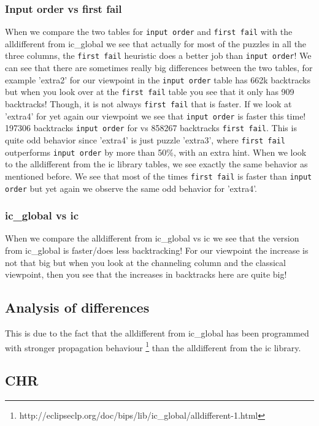 \documentclass{report}
\begin{document}
\subsubsection{Input order vs first fail}
When we compare the two tables for \texttt{input order} and \texttt{first fail} with the alldifferent from ic\_global we see that actually for most of the puzzles in all the three columns, the \texttt{first fail} heuristic does a better job than \texttt{input order}! We can see that there are sometimes really big differences between the two tables, for example 'extra2' for our viewpoint in the \texttt{input order} table has 662k backtracks but when you look over at the \texttt{first fail} table you see that it only has 909 backtracks! Though, it is not always \texttt{first fail} that is faster. If we look at 'extra4' for yet again our viewpoint we see that \texttt{input order} is faster this time! 197306 backtracks \texttt{input order} for vs 858267 backtracks \texttt{first fail}. This is quite odd behavior since 'extra4' is just puzzle 'extra3', where \texttt{first fail} outperforms \texttt{input order} by more than 50\%, with an extra hint.
\newline
\newline
When we look to the alldifferent from the ic library tables, we see exactly the same behavior as mentioned before. We see that most of the times \texttt{first fail} is faster than \texttt{input order} but yet again we observe the same odd behavior for 'extra4'. 

\subsubsection{ic\_global vs ic}
When we compare the alldifferent from ic\_global vs ic we see that the version from ic\_global is faster/does less backtracking! For our viewpoint the increase is not that big but when you look at the channeling column and the classical viewpoint, then you see that the increases in backtracks here are quite big! 

\subsection{Analysis of differences}
This is due to the fact that the alldifferent from ic\_global has been programmed with stronger propagation behaviour \footnote{http://eclipseclp.org/doc/bips/lib/ic\_global/alldifferent-1.html} than the alldifferent from the ic library. 
\subsection{CHR}
\end{document}
